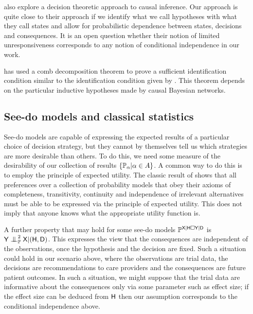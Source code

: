 \citet{heckerman_decision-theoretic_1995} also explore a decision theoretic approach to causal inference. Our approach is quite close to their approach if we identify what we call hypotheses with what they call states and allow for probabilistic dependence between states, decisions and consequences. It is an open question whether their notion of limited unresponsiveness corresponds to any notion of conditional independence in our work.

\citet{jacobs_causal_2019} has used a comb decomposition theorem to prove a sufficient identification condition similar to the identification condition given by \citet{tian2002general}. This theorem depends on the particular inductive hypotheses made by causal Bayesian networks.

\subsection{See-do models and classical statistics}

See-do models are capable of expressing the expected results of a particular choice of decision strategy, but they cannot by themselves tell us which strategies are more desirable than others. To do this, we need some measure of the desirability of our collection of results $\{\mathbb{P}_\alpha|\alpha\in A\}$. A common way to do this is to employ the principle of expected utility. The classic result of \citet{von_neumann_theory_1944} shows that all preferences over a collection of probability models that obey their axioms of completeness, transitivity, continuity and independence of irrelevant alternatives must be able to be expressed via the principle of expected utility. This does not imply that anyone knows what the appropriate utility function is.

A further property that may hold for some see-do models $\mathbb{P}^{\mathsf{X}|\mathsf{H}\square \mathsf{Y}|\mathsf{D}}$ is $\RV{Y}\CI^2_{\prob{P}} \RV{X}|(\RV{H},\RV{D})$. This expresses the view that the consequences are independent of the observations, once the hypothesis and the decision are fixed. Such a situation could hold in our scenario above, where the observations are trial data, the decisions are recommendations to care providers and the consequences are future patient outcomes. In such a situation, we might suppose that the trial data are informative about the consequences only via some parameter such as effect size; if the effect size can be deduced from $\mathsf{H}$ then our assumption corresponds to the conditional independence above.

